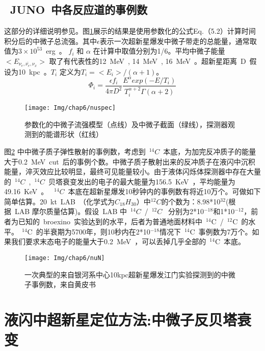 \subsection{~JUNO~中各反应道的事例数}
这部分的详细说明参见\citep{an2015neutrino}。图\ref{fig:nuspec}展示的结果是使用参数化的公式Eq.（5.2）计算时间积分后的中微子总流强。其中$\epsilon$表示一次超新星爆发中微子带走的总能量，通常取值为$3\times10^{53}$~erg~。 $f_i$ 和 $\alpha$ 在计算中取值分别为1/6。平均中微子能量$<E_{\nu_e,\bar{\nu_e},\nu_x}>$ 取了有代表性的12~MeV~, 14~MeV~, 16~MeV~。超新星距离~D~假设为10~kpc~。$T_i$ 定义为$T_i = <E_i> /(\alpha+1)$。
\begin{equation}\label{eq:flux}
\Phi_i=\frac{\epsilon f_i}{4\pi D^2}\frac{E^{\alpha} exp(-E/T_i)}{T^{\alpha+2}_{i}\Gamma(\alpha+2)}
\end{equation}
\begin{figure}[!htbp]
  \centering
   \texttt{[image: Img/chap6/nuspec]}
    \caption{参数化的中微子流强模型（点线）及中微子截面（绿线），探测器观测到的能谱形状（红线）}
  \label{fig:nuspec}
\end{figure}


图\ref{fig:pnuN} 中中微子质子弹性散射的事例数，考虑到~$^{14}C$~本底，为加完反冲质子的能量大于0.2~MeV~cut~后的事例个数。中微子质子散射出来的反冲质子在液闪中沉积能量，淬灭效应比较明显，最终可见能量较小。由于液体闪烁体探测器中存在大量的~$^{14}C$~,~$^{14}C$~贝塔衰变发出的电子的最大能量为156.5~KeV~，平均能量为49.16~KeV~。 ~$^{14}C$~本底在超新星爆发10秒钟内的事例数有将近10万个。可做如下简单估算。20~kt~LAB~（化学式为$C_{18}H_{30}$）中$^{12}C$的个数为：8.98*10$^{32}$(根据~LAB 摩尔质量估算)。假设~LAB 中~$^{14}C$~/~$^{12}C$~ 分别为2*10$^{-18}$和1*10$^{-12}$，前者为已知的~broexino~实验达到的水平，后者为普通地面材料中~$^{14}$C~/~$^{12}$C~的水平。~$^{14}$C~的半衰期为5700年，则10秒内在2*10$^{-18}$情况下~$^{14}$C~事例数为7万个。如果我们要求末态电子的能量大于0.2~MeV~，可以丢掉几乎全部的~$^{14}$C~本底。
\begin{figure}[!htbp]
  \centering
   \texttt{[image: Img/chap6/nuN]}
    \caption{一次典型的来自银河系中心10kpc超新星爆发江门实验探测到的中微子事例数，来自黄皮书}
  \label{fig:pnuN}
\end{figure}

\section{液闪中超新星定位方法:中微子反贝塔衰变}
